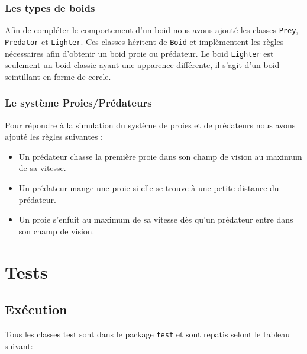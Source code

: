 \documentclass [a4paper,11pt,titlepage] {article}
\begin{document}
\subsubsection {Les types de boids}

Afin de compléter le comportement d'un boid nous avons ajouté les classes \texttt{Prey}, \texttt{Predator} et \texttt{Lighter}. Ces classes héritent de \texttt{Boid} et implèmentent les règles nécessaires afin d'obtenir un boid proie ou prédateur. Le boid \texttt{Lighter} est seulement un boid classic ayant une apparence différente, il s'agit d'un boid scintillant en forme de cercle.

\subsubsection {Le système Proies/Prédateurs}

Pour répondre à la simulation du système de proies et de prédateurs nous avons ajouté les règles suivantes :
\begin{itemize}
\item Un prédateur chasse la première proie dans son champ de vision au maximum de sa vitesse.
\item Un prédateur mange une proie si elle se trouve à une petite distance du prédateur.
\item Un proie s'enfuit au maximum de sa vitesse dès qu'un prédateur entre dans son champ de vision.
\end{itemize}

\section {Tests}

\subsection {Exécution}
Tous les classes test sont dans le package \texttt{test} et sont repatis selont le tableau suivant:
\end{document}
